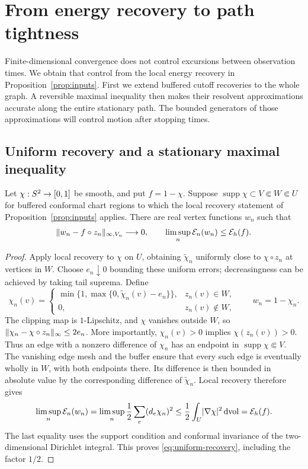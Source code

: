 \section{From energy recovery to path tightness}\label{sec:tightness}

Finite-dimensional convergence does not control excursions between observation
times. We obtain that control from the local energy recovery in
Proposition~\ref{prop:inputs}. First we extend buffered cutoff recoveries to
the whole graph. A reversible maximal inequality then makes their resolvent
approximations accurate along the entire stationary path. The bounded
generators of those approximations will control motion after stopping times.

\subsection{Uniform recovery and a stationary maximal inequality}

\begin{lemma}\label{lem:uniform-recovery}
Let $\chi:S^2\to[0,1]$ be smooth, and put $f=1-\chi$. Suppose
$\operatorname{supp}\chi\subset V\Subset W\Subset U$ for buffered conformal
chart regions to which the local recovery statement of
Proposition~\ref{prop:inputs} applies. There are real vertex functions $w_n$
such that
\begin{equation}\label{eq:uniform-recovery}
 \lVert w_n-f\circ z_n\rVert_{\infty,V_n}\longrightarrow0,
 \qquad \limsup_n\mathcal E_n(w_n)\le\mathcal E_h(f).
\end{equation}
\end{lemma}

\begin{proof}
Apply local recovery to $\chi$ on $U$, obtaining $\widetilde\chi_n$ uniformly
close to $\chi\circ z_n$ at vertices in $W$. Choose $e_n\downarrow0$
bounding these uniform errors; decreasingness can be achieved by taking tail
suprema. Define
\[
 \chi_n(v)=
 \begin{cases}
 \min\{1,\max\{0,\widetilde\chi_n(v)-e_n\}\},&z_n(v)\in W,\\
 0,&z_n(v)\notin W,
 \end{cases}
 \qquad w_n=1-\chi_n.
\]
The clipping map is $1$-Lipschitz, and $\chi$ vanishes outside $W$, so
$\lVert\chi_n-\chi\circ z_n\rVert_\infty\le2e_n$. More importantly,
$\chi_n(v)>0$ implies $\chi(z_n(v))>0$. Thus an edge with a nonzero difference
of $\chi_n$ has an endpoint in $\operatorname{supp}\chi\Subset V$.
The vanishing edge mesh and the buffer ensure that every such edge is
eventually wholly in $W$, with both endpoints there. Its difference is then
bounded in absolute value by the corresponding difference of
$\widetilde\chi_n$. Local recovery therefore gives
\[
 \limsup_n\mathcal E_n(w_n)
 =\limsup_n\frac12\sum_e(d_e\chi_n)^2
 \le\frac12\int_U\lvert\nabla\chi\rvert^2\,\mathrm d\mathrm{vol}
 =\mathcal E_h(f).
\]
The last equality uses the support condition and conformal invariance of
the two-dimensional Dirichlet integral. This proves
\eqref{eq:uniform-recovery}, including the factor $1/2$.
\end{proof}

